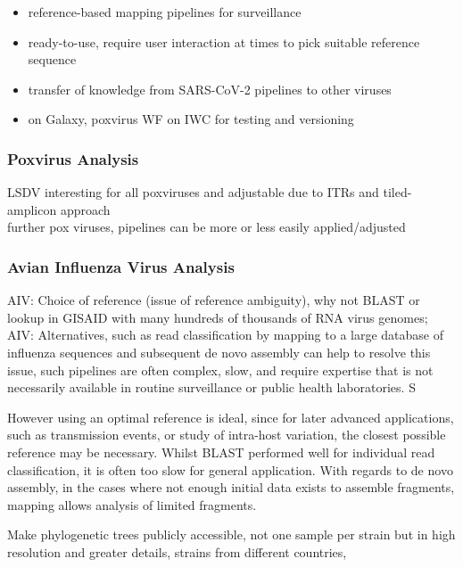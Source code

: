 \begin{itemize}
    \item reference-based mapping pipelines for surveillance
    \item ready-to-use, require user interaction at times to pick suitable reference sequence
    \item transfer of knowledge from SARS-CoV-2 pipelines to other viruses
    \item on Galaxy, poxvirus WF on IWC for testing and versioning
\end{itemize}

\subsubsection*{Poxvirus Analysis}
\ac{LSDV} interesting for all poxviruses and adjustable due to \acp{ITR} and tiled-amplicon approach \\
further pox viruses, pipelines can be more or less easily applied/adjusted 


\subsubsection*{Avian Influenza Virus Analysis}

AIV: Choice of reference (issue of reference ambiguity), why not BLAST or lookup in GISAID with many hundreds of thousands of RNA virus genomes; \\
AIV: Alternatives, such as read classification by mapping to a large database of influenza sequences and subsequent de novo assembly can help to resolve this issue, such pipelines are often complex, slow, and require expertise that is not necessarily available in routine
surveillance or public health laboratories. S

However using an optimal reference is ideal, since for later advanced applications, such as transmission events, or study of intra-host variation, the closest possible reference may be necessary. Whilst BLAST performed well for individual read classification, it is often too slow for general application. With regards to de novo assembly, in the cases where not enough initial data exists to assemble fragments, mapping allows analysis of limited fragments. 

Make phylogenetic trees publicly accessible, not one sample per strain but in high resolution and greater details, strains from different countries,


